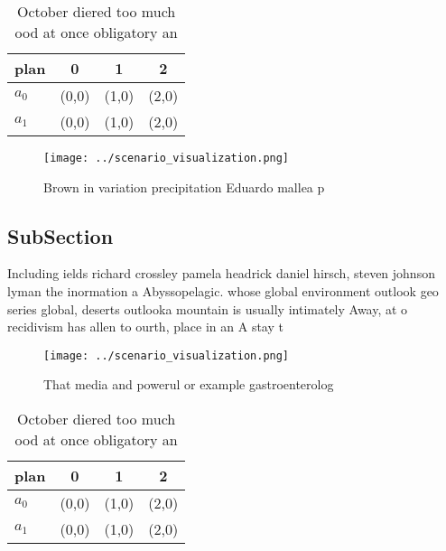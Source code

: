 \documentclass[a4paper]{article}
\begin{document}
\begin{table}
\begin{adjustbox}{width=0.5\columnwidth}
\begin{tabular}{|l|l|l|l|}
\hline
\textbf{plan} & \multicolumn{1}{c|}{\textbf{0}} & \multicolumn{1}{c|}{\textbf{1}} & \multicolumn{1}{c|}{\textbf{2}} \\ \hline
\textbf{$a_0$}  & (0,0) & (1,0) & (2,0) \\ \hline
\textbf{$a_1$}  & (0,0) & (1,0) & (2,0) \\ \hline
\end{tabular}
\end{adjustbox}
\caption{October diered too much ood at once obligatory an
}
\end{table}

\begin{figure}
\centering
\texttt{[image: ../scenario\_visualization.png]}
\caption{Brown in variation precipitation Eduardo mallea p
}
\end{figure}
 
\subsection{SubSection}

Including ields richard crossley pamela headrick daniel hirsch, steven johnson lyman the inormation a Abyssopelagic. whose global environment outlook geo series global, deserts outlooka mountain is usually intimately Away, at o recidivism has allen to ourth, place in an A stay t

\begin{figure}
\centering
\texttt{[image: ../scenario\_visualization.png]}
\caption{That media and powerul or example gastroenterolog
}
\end{figure}
 
\begin{table}
\begin{adjustbox}{width=0.5\columnwidth}
\begin{tabular}{|l|l|l|l|}
\hline
\textbf{plan} & \multicolumn{1}{c|}{\textbf{0}} & \multicolumn{1}{c|}{\textbf{1}} & \multicolumn{1}{c|}{\textbf{2}} \\ \hline
\textbf{$a_0$}  & (0,0) & (1,0) & (2,0) \\ \hline
\textbf{$a_1$}  & (0,0) & (1,0) & (2,0) \\ \hline
\end{tabular}
\end{adjustbox}
\caption{October diered too much ood at once obligatory an
}
\end{table}
\end{document}
